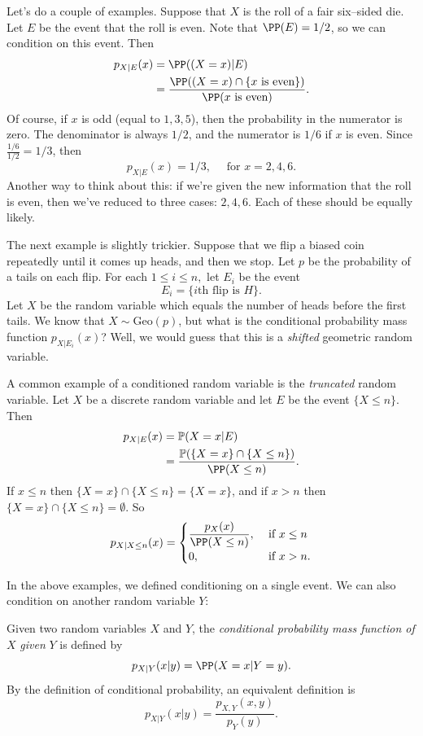 \documentclass{ximera}
\begin{document}
Let's do a couple of examples. Suppose that $X$ is the roll of a fair six--sided die. Let $E$ be the event that the roll is even. Note that $\PP(E)=1/2$, so we can condition on this event. Then
\begin{align*}
p_{X \vert E}(x) &= \PP((X = x) \vert E)\\
&= \frac{ \PP ((X=x) \cap \{x \text{ is even}\} )}{ \PP(x \text{ is even})}. 
\end{align*}
Of course, if $x$ is odd (equal to $1,3,5$), then the probability in the numerator is zero. The denominator is always $1/2$, and the numerator is $1/6$ if $x$ is even. Since $\frac{1/6}{1/2}=1/3$, then 
$$
p_{X\vert E}(x)
= 
1/3, \quad \text{ for } x =2,4,6.
$$
Another way to think about this: if we're given the new information that the roll is even, then we've reduced to three cases: $2,4,6$. Each of these should be equally likely.

The next example is slightly trickier. Suppose that we flip a biased coin repeatedly until it comes up heads, and then we stop. Let $p$ be the probability of a tails on each flip. For each $1 \leq i \leq n,$ let $E_i$ be the event 
$$
E_i = \{i\text{th flip is } H\}.
$$
Let $X$ be the random variable which equals the number of heads before the first tails. We know that $X\sim \text{Geo}(p)$, but what is the conditional probability mass function $p_{X \vert E_i}(x)$? Well, we would guess that this is a \textit{shifted} geometric random variable. 

A common example of a conditioned random variable is the \textit{truncated} random variable. Let $X$ be a discrete random variable and let $E$ be the event $\{X \leq n\}$. Then
\begin{align*}
p_{X\vert E}(x) &= \mathbb{P}( X = x \vert E)\\
&= \frac{\mathbb{P}( \{X = x\} \cap \{X \leq n\}) }{ \PP(X \leq n)}.
\end{align*}
If $x \leq n$ then $ \{X = x\} \cap \{X \leq n\} = \{X=x\}$, and if $x> n$ then $\{X = x\} \cap \{X \leq n\}=\emptyset$. So
$$
p_{X \vert X \leq n }(x) = 
\begin{cases}
\dfrac{p_{X}(x)}{\PP(X \leq n)}, & \text{ if }  x \leq n\\
0, & \text{ if }  x > n.
\end{cases}
$$


In the above examples, we defined conditioning on a single event. We can also condition on another random variable $Y$:

\begin{definition}
Given two random variables $X$ and $Y$, the \textit{conditional probability mass function of} $X$ \textit{given} $Y$ is defined by 
$$
p_{X \vert Y}(x \vert y) = \PP(X=x \vert Y=y).
$$
By the definition of conditional probability, an equivalent definition is
$$
p_{X \vert Y}(x \vert y) = \frac{p_{X,Y}(x,y)}{p_Y(y)}.
$$
\end{definition}
\end{document}
